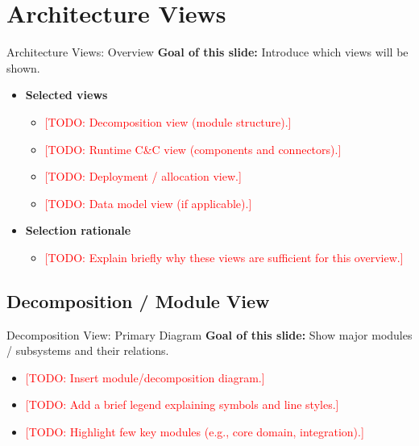 \documentclass[aspectratio=169]{beamer}
\newcommand{\TODO}[1]{\textcolor{red}{[TODO: #1]}}
\begin{document}
\section{Architecture Views}


\begin{frame}{Architecture Views: Overview}
  \textbf{Goal of this slide:} Introduce which views will be shown.

  \begin{itemize}
    \item \textbf{Selected views}
      \begin{itemize}
        \item \TODO{Decomposition view (module structure).}
        \item \TODO{Runtime C\&C view (components and connectors).}
        \item \TODO{Deployment / allocation view.}
        \item \TODO{Data model view (if applicable).}
      \end{itemize}
    \item \textbf{Selection rationale}
      \begin{itemize}
        \item \TODO{Explain briefly why these views are sufficient for this overview.}
      \end{itemize}
  \end{itemize}
\end{frame}

\subsection*{Decomposition / Module View}

\begin{frame}{Decomposition View: Primary Diagram}
  \textbf{Goal of this slide:} Show major modules / subsystems and their relations.

  \begin{itemize}
    \item \TODO{Insert module/decomposition diagram.}
    \item \TODO{Add a brief legend explaining symbols and line styles.}
    \item \TODO{Highlight few key modules (e.g., core domain, integration).}
  \end{itemize}
\end{frame}
\end{document}
